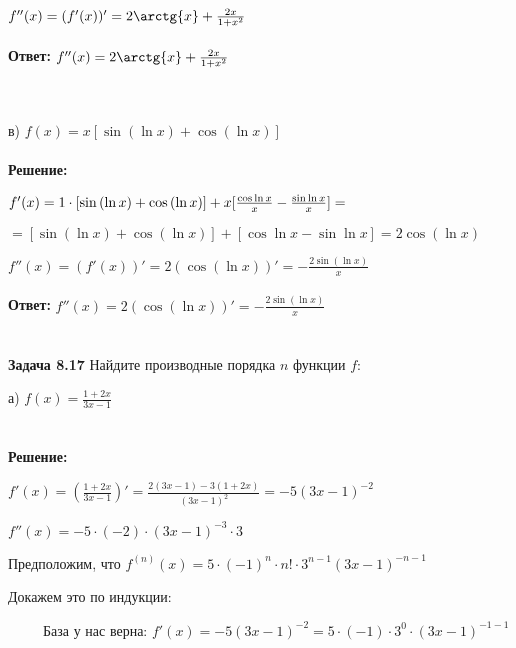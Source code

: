 \documentclass[12pt]{article}
\begin{document}
    \\
    \par $f''(x) = (f'(x))' = 2\arctg{x} + \frac{2x}{1 + x^2}$
    \\
    \\ \textbf{Ответ: } $f''(x) = 2\arctg{x} + \frac{2x}{1 + x^2}$
    \\ \\ \\
    \par в) $f(x) = x[\sin{(\ln{x})} + \cos{(\ln{x})}]$\\
    \\ \textbf{Решение: }
    \par $f'(x) = 1 \cdot [\sin{(\ln{x})} + \cos{(\ln{x})}] + x[\frac{\cos{\ln{x}}}{x} - \frac{\sin{\ln{x}}}{x}] = 
    \\ 
    $\par $= [\sin{(\ln{x})} + \cos{(\ln{x})}] + [\cos{\ln{x}} - \sin{\ln{x}}] = 2\cos{(\ln{x})}$
    \\
    \par $f''(x) = (f'(x))' = 2(\cos{(\ln{x})})' = -\frac{2\sin{(\ln{x})}}{x}$
    \\
    \\ \textbf{Ответ: } $f''(x) = 2(\cos{(\ln{x})})' = -\frac{2\sin{(\ln{x})}}{x}$
    \\ \\
    \\
    {\large \bf Задача 8.17} Найдите производные порядка $n$ функции $f$:
    \\
    \par а) $f(x) = \frac{1 + 2x}{3x - 1}$\\
    \\
    \\ \textbf{Решение: } 
    \par $f'(x) = \left(\frac{1 + 2x}{3x - 1}\right)' = \frac{2(3x - 1) - 3(1 + 2x)}{(3x - 1)^2} = -5(3x - 1)^{-2}$
    \\
    \par $f''(x) = -5 \cdot (-2) \cdot (3x - 1)^{-3} \cdot 3$
    \\
    \par Предположим, что $f^{(n)}(x) = 5 \cdot (-1)^{n} \cdot n! \cdot 3^{n - 1}(3x - 1)^{-n - 1}$
    \\
    \par Докажем это по индукции: 
    \\
    \par \ \ \ \ \ База у нас верна: $f'(x) = -5(3x - 1)^{-2} = 5 \cdot (-1) \cdot 3^0 \cdot (3x - 1)^{-1 - 1}$
\end{document}

